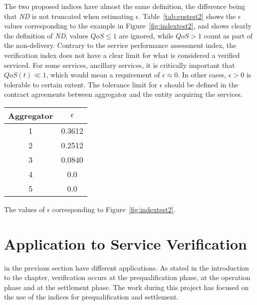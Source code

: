 The two proposed indices have almost the same definition, the difference being that \emph{ND} is not truncated when estimating $\epsilon$. Table~\ref{tab:epstest2} shows the $\epsilon$ values corresponding to the example in Figure~\ref{fig:indextest2}, and shows clearly the definition of \emph{ND}, \ie values $QoS \leq 1$ are ignored, while $QoS > 1$ count as part of the non-delivery. Contrary to the service performance assessment index, the verification index does not have a clear limit for what is considered a verified serviced. For some services, \eg ancillary services, it is critically important that $QoS(t) \ll 1$, which would mean a requirement of $\epsilon \approx 0$. In other cases, $\epsilon > 0$ is tolerable to certain extent. The tolerance limit for $\epsilon$ should be defined in the contract agreements between aggregator and the entity acquiring the services.

\begin{margintable}[-5\baselineskip]%
	\centering
	\begin{tabular}{cc}
		\toprule
		Aggregator & $\epsilon$ \\
		\midrule
		1 & 0.3612 \\
		2 & 0.2512  \\
		3 & 0.0840  \\
		4 & 0.0  \\
		5 & 0.0 \\
		\bottomrule
	\end{tabular}
	\caption{The values of $\epsilon$ corresponding to Figure~\ref{fig:indextest2}.}
	\label{tab:epstest2}
\end{margintable}


\section{Application to Service Verification}
 in the previous section have different applications. As stated in the introduction to the chapter, verification occurs at the prequalification phase, at the operation phase and at the settlement phase. The work during this project has focused on the use of the indices for prequalification and settlement. 

